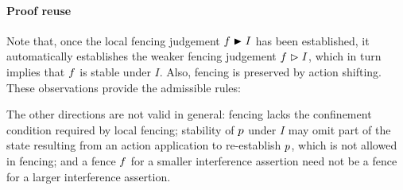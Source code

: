 \paragraph{Proof reuse}
Note that, once the  local fencing judgement
$\lass{F}\strictfences I$ has been established, it automatically
establishes  the weaker fencing judgement $\lass{F}\fences I$, which  in turn
implies that $\lass{F}$ is stable under
$I$. Also, fencing is preserved by action shifting. These observations
provide the admissible rules: 
\begin{mathpar}
  
  
\end{mathpar}
	 The other directions are not valid in general: 
fencing lacks the confinement condition required by local
fencing; stability of $\lass{P}$
under $I$ may omit part of the state resulting from an action
application to re-establish $\lass{P}$, which is not allowed in
fencing;  and
a fence $\lass{F}$ for a smaller  interference assertion  need not be a fence for
a larger interference assertion. 

	
	
		
	

%	
%		
		

